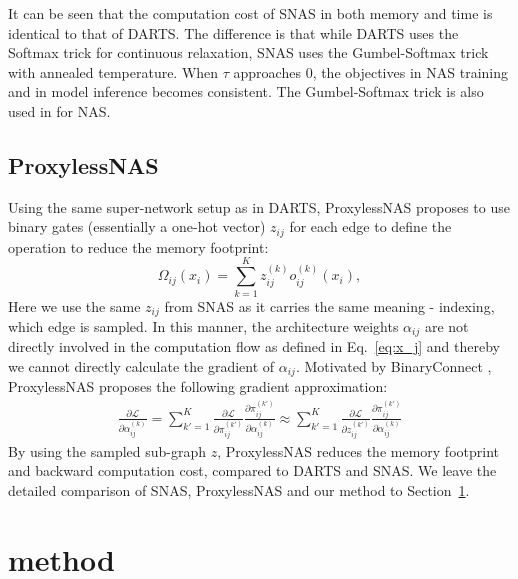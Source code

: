\documentclass{article}
\newcommand{\neqref}{Eq.~\eqref}
\newcommand{\secref}{Section~\ref}
\begin{document}
It can be seen that the computation cost of SNAS in both memory and time is identical to that of DARTS.
The difference is that while DARTS uses the Softmax trick for continuous relaxation, SNAS uses the Gumbel-Softmax trick with annealed temperature. When $\tau$ approaches $0$, the objectives in NAS training and in model inference becomes consistent. The Gumbel-Softmax trick is also used in \cite{wu2019fbnet, dong2019searching} for NAS.

\subsection{ProxylessNAS}
\label{sec:relatedwork:pNAS}
Using the same super-network setup as in DARTS, ProxylessNAS proposes to use binary gates (essentially a one-hot vector) $z_{ij}$ for each edge to define the operation to reduce the memory footprint:
\begin{equation}
    \Omega_{ij}(x_i) = \sum_{k=1}^K z_{ij}^{(k)} o_{ij}^{(k)}(x_i),
    \label{eq:z-operation}
\end{equation}
Here we use the same $z_{ij}$ from SNAS as it carries the same meaning - indexing, which edge is sampled.
In this manner, the architecture weights $\alpha_{ij}$ are not directly involved in the computation flow as defined in \neqref{eq:x_j} and thereby we cannot directly calculate the gradient of $\alpha_{ij}$.
Motivated by BinaryConnect \cite{courbariaux2015binaryconnect}, ProxylessNAS proposes the following gradient approximation:
\begin{equation}
    \begin{aligned}
        \frac{\partial{\mathcal{L}}}{\partial{\alpha_{ij}^{(k)}}}
        = \sum_{k'=1}^K \frac{\partial{\mathcal{L}}}{\partial{\pi_{ij}^{(k')}}} \frac{\partial{\pi_{ij}^{(k')}}}{\partial{\alpha_{ij}^{(k)}}}
        \approx \sum_{k'=1}^K \frac{\partial{\mathcal{L}}}{\partial{z_{ij}^{(k')}}} \frac{\partial{\pi_{ij}^{(k')}}}{\partial{\alpha_{ij}^{(k)}}}
    \end{aligned}
    \label{eq:proxyless}
\end{equation}
By using the sampled sub-graph $z$, ProxylessNAS reduces the memory footprint and backward computation cost, compared to DARTS and SNAS.
We leave the detailed comparison of SNAS, ProxylessNAS and our method to \secref{sec:method}.

\section{method}
\label{sec:method}
\end{document}

